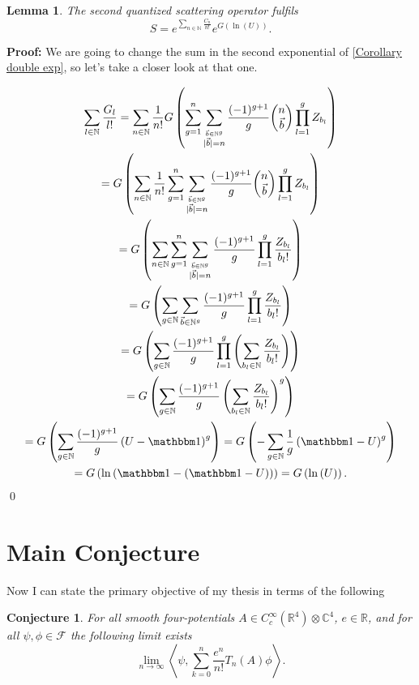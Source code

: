 \documentclass[b5paper,draft,openbib,12pt]{memoir}
\newtheorem{Conj}[Def]{Conjecture}
\newtheorem{Lemma}[Def]{Lemma}
\newcommand{\id}{{\mathbbm 1}}
\begin{document}
\begin{Lemma}
The second quantized scattering operator fulfils
\begin{equation}
S= e^{\sum_{n\in\mathbb{N}} \frac{C_n}{n!}} e^{G(\ln (U))}.
\end{equation}
\end{Lemma}
\textbf{Proof:} We are going to change the sum in the second exponential of 
\eqref{Corollary double exp}, so let's take a closer look at that one.

\begin{multline}
\sum_{l\in\mathbb{N}} \frac{G_{l}}{l!}= 
\sum_{n \in\mathbb{N}} \frac{1}{n!} 
G\left( \sum_{g=1}^n \sum_{\stackrel{\vec{b}\in\mathbb{N}^g}{|\vec{b}|=n}}\frac{(-1)^{g+1}}{g} 
\binom{n}{\vec{b}} \prod_{l=1}^g Z_{b_l}  \right)\\
=G\left( \sum_{n \in\mathbb{N}} \frac{1}{n!} 
 \sum_{g=1}^n \sum_{\stackrel{\vec{b}\in\mathbb{N}^g}{|\vec{b}|=n}}\frac{(-1)^{g+1}}{g} 
\binom{n}{\vec{b}} \prod_{l=1}^g Z_{b_l}  \right)\\
=G\left( \sum_{n \in\mathbb{N}}
 \sum_{g=1}^n \sum_{\stackrel{\vec{b}\in\mathbb{N}^g}{|\vec{b}|=n}}\frac{(-1)^{g+1}}{g} 
 \prod_{l=1}^g \frac{Z_{b_l}}{b_l!}  \right)\\
=G\left( 
 \sum_{g\in\mathbb{N}} \sum_{\vec{b}\in\mathbb{N}^g}\frac{(-1)^{g+1}}{g} 
\prod_{l=1}^g \frac{Z_{b_l}}{b_l!}  \right)\\
=G\left( 
 \sum_{g\in\mathbb{N}} \frac{(-1)^{g+1}}{g} 
\prod_{l=1}^g \left(\sum_{b_l\in\mathbb{N}} \frac{Z_{b_l}}{b_l!} \right) \right)\\
=G\left( 
 \sum_{g\in\mathbb{N}} \frac{(-1)^{g+1}}{g} 
 \left(\sum_{b_l\in\mathbb{N}} \frac{Z_{b_l}}{b_l!} \right)^g \right)\\
 =G\left( 
 \sum_{g\in\mathbb{N}} \frac{(-1)^{g+1}}{g} 
 \left(U-\id \right)^g \right)
 =G\left( -
 \sum_{g\in\mathbb{N}} \frac{1}{g} 
 \left(\id-U \right)^g \right)\\
  =G\left( 
 \ln \left(\id-\left(\id-U\right) \right) \right)
 =G\left( \ln \left(U\right)\right).
\end{multline}
\qed

\section{Main Conjecture}\label{sec:main result}
Now I can state the primary objective of my thesis in terms of the following
\begin{Conj}\label{main_result}
For all smooth four-potentials \(A\in C_{c}^\infty(\mathbb{R}^4)\otimes
\mathbb{C}^4\),
\(e \in \mathbb{R}\), and for all \(\psi, \phi \in
\mathcal{F}\) the following limit exists
\begin{equation}
\lim_{n\rightarrow \infty} \left\langle \psi, \sum_{k=0}^n  \frac{e^n}{n!} T_n (A)\phi \right\rangle.
\end{equation}
\end{Conj}
\end{document}

